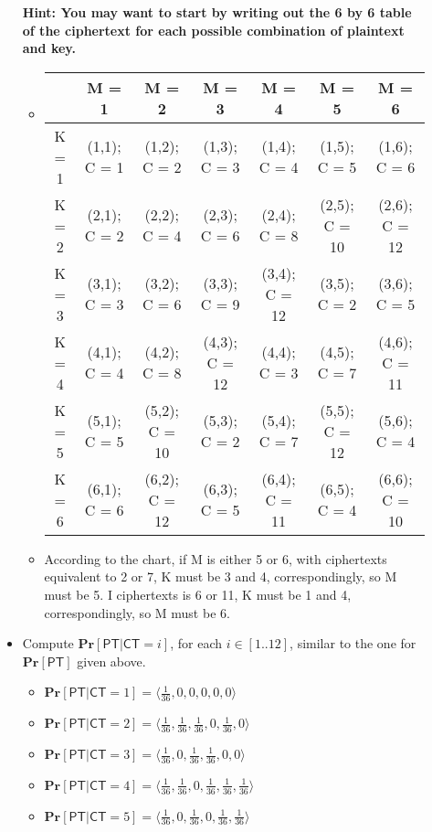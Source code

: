 \documentclass[11pt]{article}
\renewcommand{\Pr}{\ensuremath{\mathbf{Pr}}\xspace}
\newcommand{\tuple}[1]{\ensuremath{\langle #1 \rangle}\xspace}
\newcommand{\PT}{\ensuremath{\mathsf{PT}}\xspace}
\newcommand{\CT}{\ensuremath{\mathsf{CT}}\xspace}
\begin{document}
\begin{description}
\begin{itemize}
\textbf{Hint: You may want to start by writing out the 6 by 6 table of the ciphertext for each possible combination of plaintext and key.}
	\begin{itemize}
	\item
		\begin{tabular}{|c|c|c|c|c|c|c|} 
		\hline
		 & M = 1 & M = 2 & M = 3 & M = 4 & M = 5 & M = 6
		\\ \hline
		K = 1 & (1,1); C = 1 & (1,2); C = 2 & (1,3); C = 3 & (1,4); C = 4 & (1,5); C = 5 & (1,6); C = 6
		\\ \hline
		K = 2 & (2,1); C = 2 & (2,2); C = 4 & (2,3); C = 6 & (2,4); C = 8 & (2,5); C = 10 & (2,6); C = 12
		\\ \hline
		K = 3 & (3,1); C = 3 & (3,2); C = 6 & (3,3); C = 9 & (3,4); C = 12 & (3,5); C = 2 & (3,6); C = 5
		\\ \hline
		K = 4 & (4,1); C = 4 & (4,2); C = 8 & (4,3); C = 12 & (4,4); C = 3 & (4,5); C = 7 & (4,6); C = 11
		\\ \hline
		K = 5 & (5,1); C = 5 & (5,2); C = 10 & (5,3); C = 2 & (5,4); C = 7 & (5,5); C = 12 & (5,6); C = 4
		\\ \hline
		K = 6 & (6,1); C = 6 & (6,2); C = 12 & (6,3); C = 5 & (6,4); C = 11 & (6,5); C = 4 & (6,6); C = 10
		\\ \hline
		\end{tabular} 
	\item 
	According to the chart, if M is either 5 or 6, with ciphertexts equivalent to 2 or 7, K must be 3 and 4, correspondingly, so M must be 5. I ciphertexts is 6 or 11, K must be 1 and 4, correspondingly, so M must be 6.\\
	\end{itemize}
 \item
Compute $\Pr[\PT| \CT=i]$, for each $i\in [1..12]$, similar to the one for $\Pr[\PT]$ given above.
	\begin{itemize}
	\item
	$\Pr[\PT| \CT=1] = \tuple{\frac{1}{36},0,0,0,0,0}$ 
	\item
	$\Pr[\PT| \CT=2] = \tuple{\frac{1}{36}, \frac{1}{36}, \frac{1}{36}, 0, \frac{1}{36},0}$ 
	\item
	$\Pr[\PT| \CT=3] = \tuple{\frac{1}{36},0,\frac{1}{36}, \frac{1}{36},0,0}$ 
	\item
	$\Pr[\PT| \CT=4] = \tuple{\frac{1}{36}, \frac{1}{36}, 0, \frac{1}{36}, \frac{1}{36}, \frac{1}{36}}$
	\item
	$\Pr[\PT| \CT=5] = \tuple{\frac{1}{36}, 0, \frac{1}{36}, 0, \frac{1}{36}, \frac{1}{36}}$ 

\end{itemize}
\end{itemize}
\end{description}
\end{document}
